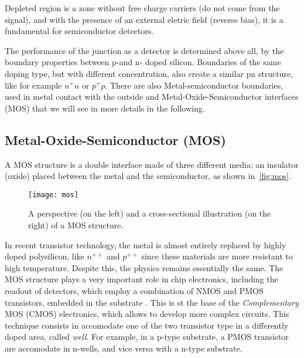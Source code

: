\begin{comment}
\begin{figure}
\centering
\texttt{[image: depletion]}
\caption{A pn-junction without external voltage in (a), with forward voltage applied in (b), and with reverse voltage applied in (c).}
\label{fig:bias}
\end{figure}
\end{comment}

Depleted region is a zone without free charge carriers (do not come from the signal), and with the presence of an external eletric field (reverse bias), it is a fundamental for semiconductor detectors.

The performance of the junction as a detector is determined above all, by the boundary properties between p-and n- doped silicon. Boundaries of the same doping type, but with different concentration, also create a similar pn structure, like for example $n^{+}n$ or $p^{+}p$. There are also Metal-semiconductor boundaries, used in metal contact with the outside and Metal-Oxide-Semiconductor interfaces (MOS) that we will see in more details in the following.
 
 
\subsection{Metal-Oxide-Semiconductor (MOS)}

A MOS structure is a double interface made of three different media: an insulator (oxide) placed between the metal and the semiconductor, as shown in~\autoref{fig:mos}.

\begin{figure}[h!]
\centering
\texttt{[image: mos]}
\caption{A perspective (on the left) and a cross-sectional illustration (on the right) of a MOS structure.}
\label{fig:mos}
\end{figure}

In recent transistor technology, the metal is almost entirely replaced by highly doped polysilicon, like $n^{++}$ and $p^{++}$ since these materials are more resistant to high temperature. Despite this, the physics remains essentially the same. 
The MOS structure plays a very important role in chip electronics, including the readout of detectors, which employ a combination of NMOS and PMOS transistors, embedded in the substrate . This is st the base of the \emph{Complementary} MOS (CMOS) electronics, which allows to develop more complex circuits. This technique consists in accomodate one of the two transistor type in a differently doped area, called \emph{well}. For example,  in a p-type substrate, a PMOS transistor are accomodate in n-wells, and vice versa with a n-type substrate. 


